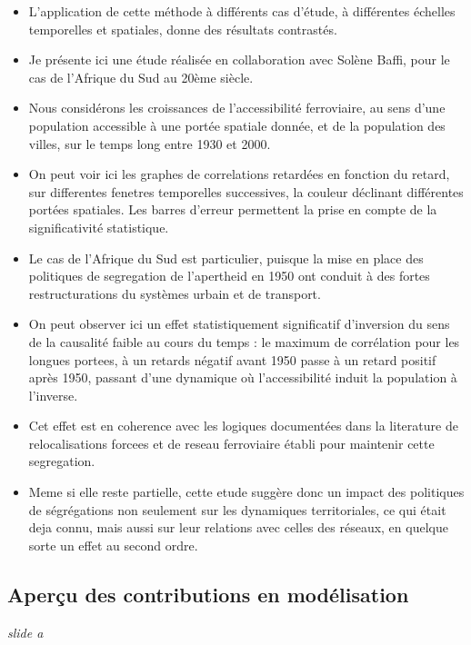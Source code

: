 \documentclass[12pt]{article}
\begin{document}
\begin{itemize}
	\item L'application de cette méthode à différents cas d'étude, à différentes échelles temporelles et spatiales, donne des résultats contrastés.
	\item Je présente ici une étude réalisée en collaboration avec Solène Baffi, pour le cas de l'Afrique du Sud au 20ème siècle.
	\item Nous considérons les croissances de l'accessibilité ferroviaire, au sens d'une population accessible à une portée spatiale donnée, et de la population des villes, sur le temps long entre 1930 et 2000.
	\item On peut voir ici les graphes de correlations retardées en fonction du retard, sur differentes fenetres temporelles successives, la couleur déclinant différentes portées spatiales. Les barres d'erreur permettent la prise en compte de la significativité statistique.
	\item Le cas de l'Afrique du Sud est particulier, puisque la mise en place des politiques de segregation de l'apertheid en 1950 ont conduit à des fortes restructurations du systèmes urbain et de transport. 
	\item On peut observer ici un effet statistiquement significatif d'inversion du sens de la causalité faible au cours du temps : le maximum de corrélation pour les longues portees, à un retards négatif avant 1950 passe à un retard positif après 1950, passant d'une dynamique où l'accessibilité induit la population à l'inverse.
	\item Cet effet est en coherence avec les logiques documentées dans la literature de relocalisations forcees et de reseau ferroviaire établi pour maintenir cette segregation.
	\item Meme si elle reste partielle, cette etude suggère donc un impact des politiques de ségrégations non seulement sur les dynamiques territoriales, ce qui était deja connu, mais aussi sur leur relations avec celles des réseaux, en quelque sorte un effet au second ordre.
\end{itemize}


\newpage


\subsection*{Aperçu des contributions en modélisation}

\textit{slide a}
\end{document}
